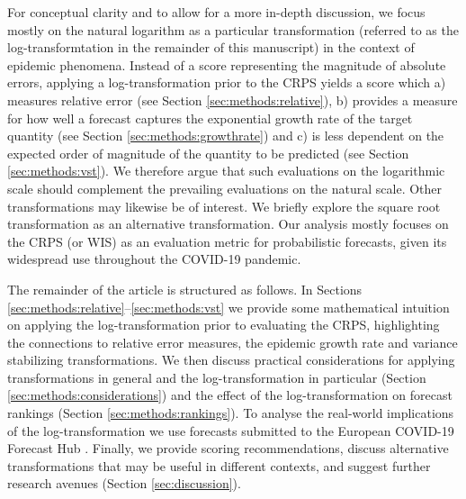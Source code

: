 \documentclass{article}
\begin{document}
For conceptual clarity and to allow for a more in-depth discussion, we focus mostly on the natural logarithm as a particular transformation (referred to as the log-transformtation in the remainder of this manuscript) in the context of epidemic phenomena. Instead of a score representing the magnitude of absolute errors, applying a log-transformation prior to the CRPS yields a score which a) measures relative error (see Section \ref{sec:methods:relative}), b) provides a measure for how well a forecast captures the exponential growth rate of the target quantity (see Section \ref{sec:methods:growthrate}) and c) is less dependent on the expected order of magnitude of the quantity to be predicted (see Section \ref{sec:methods:vst}). %
We therefore argue that such evaluations on the logarithmic scale should complement the prevailing evaluations on the natural scale. 
Other transformations may likewise be of interest. We briefly explore the square root transformation as an alternative transformation. %
Our analysis mostly focuses on the CRPS (or WIS) as an evaluation metric for probabilistic forecasts, given its widespread use throughout the COVID-19 pandemic. 

The remainder of the article is structured as follows. In Sections \ref{sec:methods:relative}--\ref{sec:methods:vst} we provide some mathematical intuition on applying the log-transformation prior to evaluating the CRPS, highlighting the connections to relative error measures, the epidemic growth rate and variance stabilizing transformations.
We then discuss practical considerations for applying transformations in general and the log-transformation in particular (Section \ref{sec:methods:considerations}) and the effect of the log-transformation on forecast rankings (Section \ref{sec:methods:rankings}). To analyse the real-world implications of the log-transformation we use forecasts submitted to the European COVID-19 Forecast Hub  \citep[Section \ref{sec:HUB}]{europeancovid-19forecasthubEuropeanCovid19Forecast2021, sherrattPredictivePerformanceMultimodel2022}. Finally, we provide scoring recommendations, discuss alternative transformations that may be useful in different contexts, and suggest further research avenues (Section \ref{sec:discussion}). 
\end{document}
